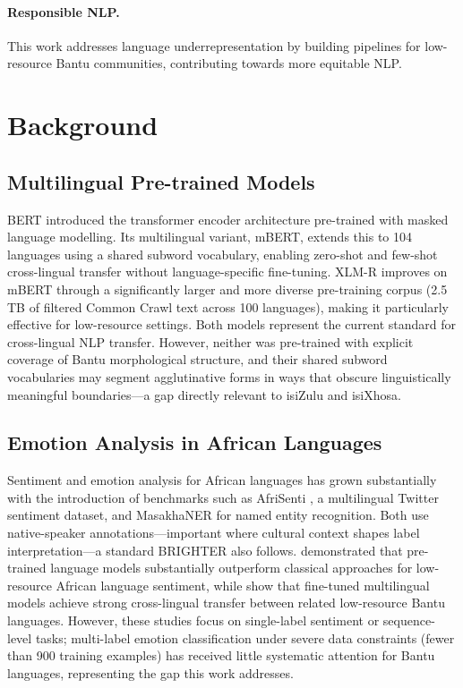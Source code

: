 \documentclass[11pt]{article}
\begin{document}
\paragraph{Responsible NLP.}
This work addresses language underrepresentation by building pipelines for
low-resource Bantu communities, contributing towards more equitable NLP.
\section{Background}

\subsection{Multilingual Pre-trained Models}

BERT \citep{devlin2019bert} introduced the transformer encoder architecture
pre-trained with masked language modelling.
Its multilingual variant, mBERT, extends this to 104 languages using a shared
subword vocabulary, enabling zero-shot and few-shot cross-lingual transfer
without language-specific fine-tuning.
XLM-R \citep{conneau2020unsupervised} improves on mBERT through a significantly
larger and more diverse pre-training corpus (2.5 TB of filtered Common Crawl
text across 100 languages), making it particularly effective for low-resource
settings.
Both models represent the current standard for cross-lingual NLP transfer.
However, neither was pre-trained with explicit coverage of Bantu morphological
structure, and their shared subword vocabularies may segment agglutinative
forms in ways that obscure linguistically meaningful boundaries---a gap
directly relevant to isiZulu and isiXhosa.

\subsection{Emotion Analysis in African Languages}

Sentiment and emotion analysis for African languages has grown substantially
with the introduction of benchmarks such as AfriSenti
\citep{muhammad2023afrisenti}, a multilingual Twitter sentiment dataset, and
MasakhaNER \citep{adelani2022masakhaner} for named entity recognition.
Both use native-speaker annotations---important where cultural context shapes
label interpretation---a standard BRIGHTER also follows.
\citet{mabokela2024explainable} demonstrated that pre-trained language models
substantially outperform classical approaches for low-resource African language
sentiment, while \citet{thangaraj2024crosslingual} show that fine-tuned multilingual
models achieve strong cross-lingual transfer between related low-resource Bantu languages.
However, these studies focus on single-label sentiment or sequence-level tasks;
multi-label emotion classification under severe data constraints (fewer than
900 training examples) has received little systematic attention for Bantu
languages, representing the gap this work addresses.
\end{document}
